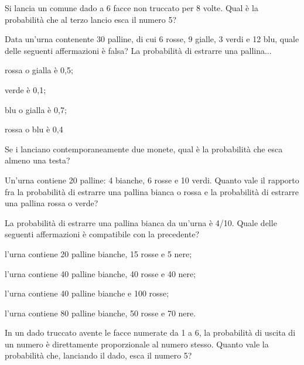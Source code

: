 \begin{esercizio} %
Si lancia un comune dado a 6 facce non truccato per 8 volte. Qual è la 
probabilità che al terzo lancio esca il numero 5?
\end{esercizio}

\begin{esercizio} %
Data un'urna contenente 30 palline, di cui 6 rosse, 9 gialle, 3 verdi e 12 blu, 
quale delle seguenti affermazioni è falsa? La probabilità di estrarre una 
pallina...
\begin{itemize*}
\item rossa o gialla è 0,5;
\item verde è 0,1;
\item blu o gialla è 0,7;
\item rossa o blu è 0,4
\end{itemize*}
\end{esercizio}

\begin{esercizio} %
Se i lanciano contemporaneamente due monete, qual è la probabilità che esca 
almeno una testa?
\end{esercizio}

\begin{esercizio} %
Un'urna contiene 20 palline: 4 bianche, 6 rosse e 10 verdi. Quanto vale il 
rapporto fra la probabilità di estrarre una pallina bianca o rossa e la 
probabilità di estrarre una pallina rossa o verde?
\end{esercizio}

\begin{esercizio} %
La probabilità di estrarre una pallina bianca da un'urna è 4/10. Quale delle 
seguenti affermazioni è compatibile con la precedente?
\begin{itemize*}
\item l'urna contiene 20 palline bianche, 15 rosse e 5 nere;
\item l'urna contiene 40 palline bianche, 40 rosse e 40 nere;
\item l'urna contiene 40 palline bianche e 100 rosse;
\item l'urna contiene 80 palline bianche, 50 rosse e 70 nere.
\end{itemize*}
\end{esercizio}

\begin{esercizio} %
In un dado truccato avente le facce numerate da 1 a 6, la probabilità di uscita 
di un numero è direttamente proporzionale al numero stesso. Quanto vale la 
probabilità che, lanciando il dado, esca il numero 5?
\end{esercizio}

